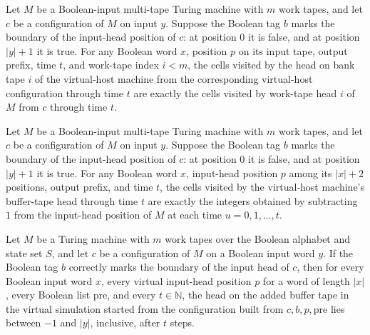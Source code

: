 \begin{theorem}
\label{Turing.vhostEmitTM_visitedByTapeHead_bank}
\leanok
{}
Let $M$ be a Boolean-input multi-tape Turing machine with $m$ work tapes, and let $c$ be
a configuration of $M$ on input $y$. Suppose the Boolean tag $b$ marks the boundary of
the input-head position of $c$: at position $0$ it is false, and at position $|y|+1$ it
is true. For any Boolean word $x$, position $p$ on its input tape, output prefix, time
$t$, and work-tape index $i<m$, the cells visited by the head on bank tape $i$ of the
virtual-host machine from the corresponding virtual-host configuration through time $t$
are exactly the cells visited by work-tape head $i$ of $M$ from $c$ through time $t$.
\end{theorem}

\begin{theorem}
\label{Turing.vhostEmitTM_visitedByTapeHead_buffer}
\leanok
{}
Let $M$ be a Boolean-input multi-tape Turing machine with $m$ work tapes, and let $c$ be
a configuration of $M$ on input $y$. Suppose the Boolean tag $b$ marks the boundary of
the input-head position of $c$: at position $0$ it is false, and at position $|y|+1$ it
is true. For any Boolean word $x$, input-head position $p$ among its $|x|+2$ positions,
output prefix, and time $t$, the cells visited by the virtual-host machine's buffer-tape
head through time $t$ are exactly the integers obtained by subtracting $1$ from the
input-head position of $M$ at each time $u=0,1,\ldots,t$.
\end{theorem}

\begin{theorem}
\label{Turing.vhostCfg_buffer_head_mem}
\leanok
{}
Let $M$ be a Turing machine with $m$ work tapes over the Boolean alphabet and state set
$S$, and let $c$ be a configuration of $M$ on a Boolean input word $y$. If the Boolean
tag $b$ correctly marks the boundary of the input head of $c$, then for every Boolean
input word $x$, every virtual input-head position $p$ for a word of length $|x|$, every
Boolean list $\mathrm{pre}$, and every $t\in\mathbb N$, the head on the added buffer
tape in the virtual simulation started from the configuration built from
$c,b,p,\mathrm{pre}$ lies between $-1$ and $|y|$, inclusive, after $t$ steps.
\end{theorem}

